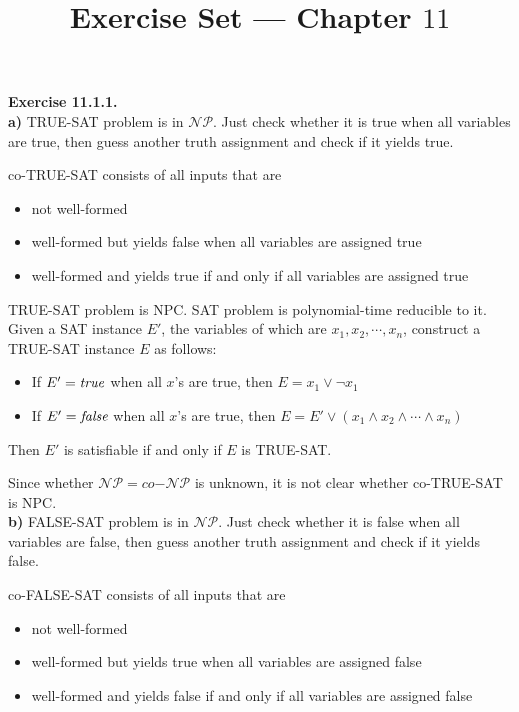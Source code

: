 \documentclass[a4paper]{article}
\title{Exercise Set --- Chapter $11$}
\date{}
\newenvironment{exercise}[1]{
	\par
	\noindent\textbf{Exercise #1.}\quad
}{
	\par
	\bigskip
}
\begin{document}
\maketitle

\begin{exercise}{11.1.1} \hspace{0pt}\\
\textbf{a)} TRUE-SAT problem is in $\mathcal{NP}$. Just check whether it is true when all variables are true,
then guess another truth assignment and check if it yields true.\par
co-TRUE-SAT consists of all inputs that are
\begin{itemize}
\item not well-formed
\item well-formed but yields false when all variables are assigned true
\item well-formed and yields true if and only if all variables are assigned true
\end{itemize}\par
TRUE-SAT problem is NPC. SAT problem is polynomial-time reducible to it. Given a SAT instance $E'$, the variables of
which are $x_1,x_2,\cdots,x_n$, construct a
TRUE-SAT instance $E$ as follows:
\begin{itemize}
\item If $E'=\it true$ when all $x$'s are true, then $E=x_1\vee\neg x_1$
\item If $E'=\it false$ when all $x$'s are true, then $E=E'\vee(x_1\wedge x_2\wedge \cdots\wedge x_n)$
\end{itemize}
Then $E'$ is satisfiable if and only if $E$ is TRUE-SAT.\par
Since whether $\mathcal{NP}=co\mathcal{-NP}$ is unknown, it is not clear whether co-TRUE-SAT is NPC.\\
\textbf{b)} FALSE-SAT problem is in $\mathcal{NP}$. Just check whether it is false when all variables are false,
then guess another truth assignment and check if it yields false.\par
co-FALSE-SAT consists of all inputs that are
\begin{itemize}
\item not well-formed
\item well-formed but yields true when all variables are assigned false
\item well-formed and yields false if and only if all variables are assigned false
\end{itemize}\par

\end{exercise}
\end{document}
